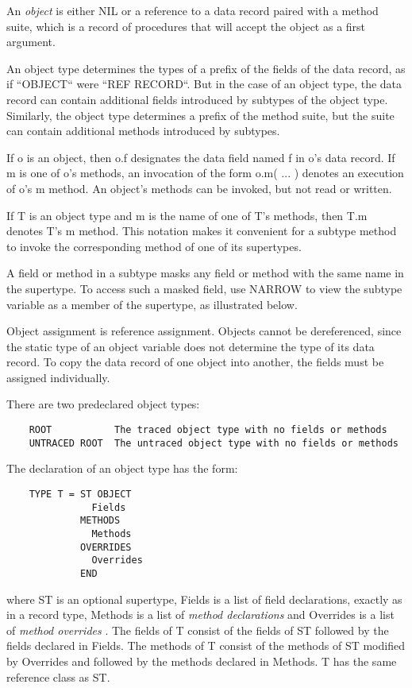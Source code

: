 \documentclass[10pt]{article}
\begin{document}
  An \emph{object}
 is either NIL or a reference to a data record paired with a method suite, which is a record of procedures that will accept the object as a first argument. 


  An object type determines the types of a prefix of the fields of the data record, as if ``OBJECT`` were ``REF RECORD``. But in the case of an object type, the data record can contain additional fields introduced by subtypes of the object type. Similarly, the object type determines a prefix of the method suite, but the suite can contain additional methods introduced by subtypes. 


 If o is an object, then o.f designates the data field named f in o's data record. If m is one of o's methods, an invocation of the form o.m( ... ) denotes an execution of o's m method. An object's methods can be invoked, but not read or written. 


  If T is an object type and m is the name of one of  T's methods, then T.m denotes T's m method. This notation makes it convenient for a subtype method to invoke the corresponding method of one of its supertypes. 


 A field or method in a subtype masks any field or method with the same name in the supertype. To access such a masked field, use NARROW to view the subtype variable as a member of the supertype, as illustrated below. 


  Object assignment is reference assignment. Objects cannot be dereferenced, since the static type of an object variable does not determine the type of its data record. To copy the data record of one object into another, the fields must be assigned individually. 


 There are two predeclared object types: 
\begin{verbatim}
    ROOT           The traced object type with no fields or methods
    UNTRACED ROOT  The untraced object type with no fields or methods
\end{verbatim}



 The declaration of an object type has the form: 
\begin{verbatim}
    TYPE T = ST OBJECT
               Fields
             METHODS
               Methods
             OVERRIDES
               Overrides
             END
\end{verbatim}
 where ST is an optional supertype, Fields is a list of field declarations, exactly as in a record type, Methods is a list of \emph{method declarations}
 and Overrides is a list of \emph{method overrides}
. The fields of T consist of the fields of ST followed by the fields declared in Fields. The methods of T consist of the methods of ST modified by Overrides and followed by the methods declared in Methods. T has the same reference class as ST. 
\end{document}
